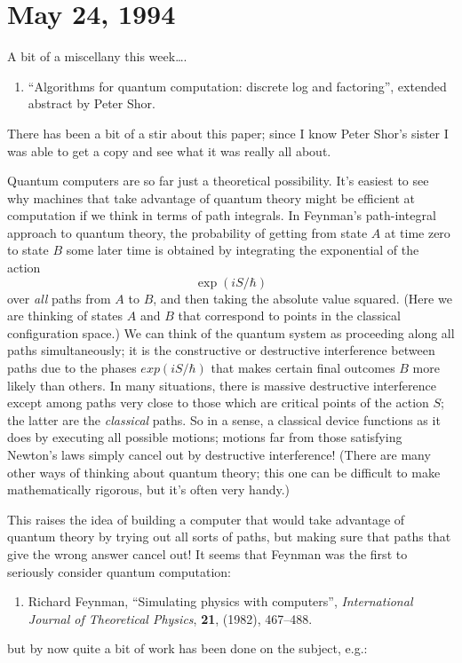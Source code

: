 \documentclass{article}
\def\tightlist{}
\begin{document}
\hypertarget{week34}{%
\section{May 24, 1994}\label{week34}}

A bit of a miscellany this week\ldots.

\begin{enumerate}
\def\labelenumi{\arabic{enumi})}
\tightlist
\item
  ``Algorithms for quantum computation: discrete log and factoring'',
  extended abstract by Peter Shor.
\end{enumerate}
\noindent
There has been a bit of a stir about this paper; since I know Peter
Shor's sister I was able to get a copy and see what it was really all
about.

Quantum computers are so far just a theoretical possibility. It's
easiest to see why machines that take advantage of quantum theory might
be efficient at computation if we think in terms of path integrals. In
Feynman's path-integral approach to quantum theory, the probability of
getting from state \(A\) at time zero to state \(B\) some later time is
obtained by integrating the exponential of the action 
\[\exp(iS/\hbar)\]
over \emph{all} paths from \(A\) to \(B\), and then taking the absolute
value squared. (Here we are thinking of states \(A\) and \(B\) that
correspond to points in the classical configuration space.) We can think
of the quantum system as proceeding along all paths simultaneously; it
is the constructive or destructive interference between paths due to the
phases \(exp(iS/\hbar)\) that makes certain final outcomes \(B\) more
likely than others. In many situations, there is massive destructive
interference except among paths very close to those which are critical
points of the action \(S\); the latter are the \emph{classical} paths.
So in a sense, a classical device functions as it does by executing all
possible motions; motions far from those satisfying Newton's laws simply
cancel out by destructive interference! (There are many other ways of
thinking about quantum theory; this one can be difficult to make
mathematically rigorous, but it's often very handy.)

This raises the idea of building a computer that would take advantage of
quantum theory by trying out all sorts of paths, but making sure that
paths that give the wrong answer cancel out! It seems that Feynman was
the first to seriously consider quantum computation:

\begin{enumerate}
\def\labelenumi{\arabic{enumi})}
\setcounter{enumi}{1}
\tightlist
\item
   Richard Feynman, ``Simulating physics with computers'',
  \emph{International Journal of Theoretical Physics},  \textbf{21},
  (1982), 467--488.
\end{enumerate}
\noindent
but by now quite a bit of work has been done on the subject, e.g.:
\end{document}
